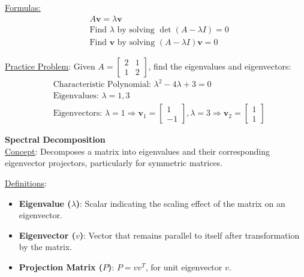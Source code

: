 \documentclass[8pt, a4paper, landscape]{extarticle} %
\begin{document}
\begin{multicols*}{4}
  \underline{Formulas:}
  \[
    \begin{aligned}
       & A \mathbf{v} = \lambda \mathbf{v}                                          \\
       & \text{Find } \lambda \text{ by solving } \det(A - \lambda I) = 0           \\
       & \text{Find } \mathbf{v} \text{ by solving } (A - \lambda I) \mathbf{v} = 0
    \end{aligned}
  \]

  \underline{Practice Problem}:
  Given \( A = \begin{bmatrix} 2 & 1 \\ 1 & 2 \end{bmatrix} \), find the eigenvalues and eigenvectors:
  \[
    \begin{aligned}
       & \text{Characteristic Polynomial: } \lambda^2 - 4\lambda + 3 = 0                                                                                                                 \\
       & \text{Eigenvalues: } \lambda = 1, 3                                                                                                                                             \\
       & \text{Eigenvectors: } \lambda = 1 \Rightarrow \mathbf{v}_1 = \begin{bmatrix} 1 \\ -1 \end{bmatrix}, \lambda = 3 \Rightarrow \mathbf{v}_2 = \begin{bmatrix} 1 \\ 1 \end{bmatrix}
    \end{aligned}
  \]

  \textbf{Spectral Decomposition}\\
  \underline{Concept}: Decomposes a matrix into eigenvalues and their corresponding eigenvector projectors, particularly for symmetric matrices.

  \underline{Definitions}:
  \begin{itemize}
    \item \textbf{Eigenvalue (\(\lambda\))}: Scalar indicating the scaling effect of the matrix on an eigenvector.
    \item \textbf{Eigenvector (\(v\))}: Vector that remains parallel to itself after transformation by the matrix.
    \item \textbf{Projection Matrix (\(P\))}: \(P = v v^T\), for unit eigenvector \(v\).
  \end{itemize}


\end{multicols*}
\end{document}
